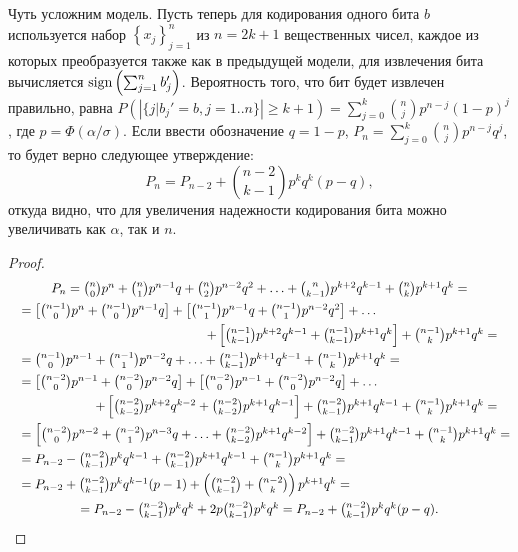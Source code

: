 Чуть усложним модель. Пусть теперь для кодирования одного бита $b$ используется набор $\left\{x_j\right\}_{j=1}^n$
из $n=2k+1$ вещественных чисел, каждое из которых преобразуется также как в предыдущей модели,
для извлечения бита вычисляется $\operatorname{sign}\left(\sum_{j=1}^n b_j'\right)$. Вероятность того, что бит будет извлечен правильно, равна 
$P\left(\left|\{j | b_j' = b, j = 1..n\}\right| \ge k + 1\right) = \sum_{j=0}^k \binom{n}{j} p^{n-j}(1-p)^j$, где $p = \Phi(\alpha / \sigma)$.
Если ввести обозначение $q = 1 - p$, $P_n = \sum_{j=0}^k \binom{n}{j} p^{n-j} q^j$, то будет верно следующее утверждение:
\begin{equation}
\label{prob_rec}
P_n = P_{n-2} + \binom{n-2}{k-1} p^k q^k (p - q),
\end{equation}
откуда видно, что для увеличения надежности кодирования бита можно увеличивать как $\alpha$, так и $n$. 
\begin{proof}
\begin{multline*}
\textstyle P_n = \binom{n}{0} p^{n} + \binom{n}{1} p^{n-1} q + \binom{n}{2} p^{n-2} q^2 + \ldots + \binom{n}{k-1} p^{k+2} q^{k-1} + \binom{n}{k} p^{k+1} q^k = \\
\shoveleft \textstyle = \left[\binom{n-1}{0} p^n + \binom{n-1}{0} p^{n-1} q \right] + \left[\binom{n-1}{1} p^{n-1} q + \binom{n-1}{1} p^{n-2} q^2 \right]
+ \ldots \\
\shoveright{\textstyle + \left[\binom{n-1}{k-1}p^{k+2}q^{k-1} + \binom{n-1}{k-1}p^{k+1}q^k \right] + \binom{n-1}{k}p^{k+1}q^k =} \\
\shoveleft \textstyle = \binom{n-1}{0} p^{n-1} + \binom{n-1}{1}p^{n-2}q + \ldots + \binom{n-1}{k-1}p^{k+1}q^{k-1} + \binom{n-1}{k} p^{k+1} q^k = \\
\shoveleft \textstyle = \left[\binom{n-2}{0}p^{n-1} + \binom{n-2}{0} p^{n-2} q \right] + \left[\binom{n-2}{0}p^{n-1} + \binom{n-2}{0} p^{n-2} q \right] +
\ldots \\
\shoveright{\textstyle + \left[\binom{n-2}{k-2}p^{k+2}q^{k-2} + \binom{n-2}{k-2}p^{k+1}q^{k-1} \right] + 
\binom{n-2}{k-1}p^{k+1}q^{k-1} + \binom{n-1}{k}p^{k+1}q^{k} = }\\
\shoveleft \textstyle = \left[\binom{n-2}{0} p^{n-2} + \binom{n-2}{1}p^{n-3}q + \ldots + \binom{n-2}{k-2}p^{k+1}q^{k-2} \right] + 
\binom{n-2}{k-1}p^{k+1}q^{k-1} + \binom{n-1}{k}p^{k+1}q^{k} = \\
\shoveleft \textstyle = P_{n-2} - \binom{n-2}{k-1}p^{k}q^{k-1} + \binom{n-2}{k-1}p^{k+1}q^{k-1} + \binom{n-1}{k}p^{k+1}q^{k} = \\ 
\shoveleft \textstyle = P_{n-2} + \binom{n-2}{k-1} p^{k}q^{k-1} (p - 1) + \left(\binom{n-2}{k-1} + \binom{n-2}{k} \right) p^{k+1}q^{k} = \\
\textstyle = P_{n-2} - \binom{n-2}{k-1} p^{k}q^{k} + 2p \binom{n-2}{k-1} p^k q^k = P_{n-2} + \binom{n-2}{k-1} p^k q^k (p - q). 
\end{multline*}
\end{proof}

